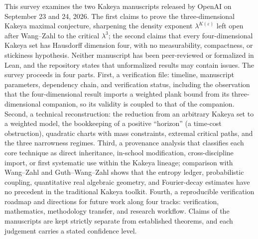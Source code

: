 This survey examines the two Kakeya manuscripts released by OpenAI on September 23 and 24, 2026. The first claims to prove the three-dimensional Kakeya maximal conjecture, sharpening the density exponent $\lambda^{K(\varepsilon)}$ left open after Wang--Zahl to the critical $\lambda^{3}$; the second claims that every four-dimensional Kakeya set has Hausdorff dimension four, with no measurability, compactness, or stickiness hypothesis. Neither manuscript has been peer-reviewed or formalized in Lean, and the repository states that unformalized results may contain issues. The survey proceeds in four parts. First, a verification file: timeline, manuscript parameters, dependency chain, and verification status, including the observation that the four-dimensional result imports a weighted plank bound from its three-dimensional companion, so its validity is coupled to that of the companion. Second, a technical reconstruction: the reduction from an arbitrary Kakeya set to a weighted model, the bookkeeping of a positive ``horizon'' (a time-cost obstruction), quadratic charts with mass constraints, extremal critical paths, and the three narrowness regimes. Third, a provenance analysis that classifies each core technique as direct inheritance, in-school modification, cross-discipline import, or first systematic use within the Kakeya lineage; comparison with Wang--Zahl and Guth--Wang--Zahl shows that the entropy ledger, probabilistic coupling, quantitative real algebraic geometry, and Fourier-decay estimates have no precedent in the traditional Kakeya toolkit. Fourth, a reproducible verification roadmap and directions for future work along four tracks: verification, mathematics, methodology transfer, and research workflow. Claims of the manuscripts are kept strictly separate from established theorems, and each judgement carries a stated confidence level.